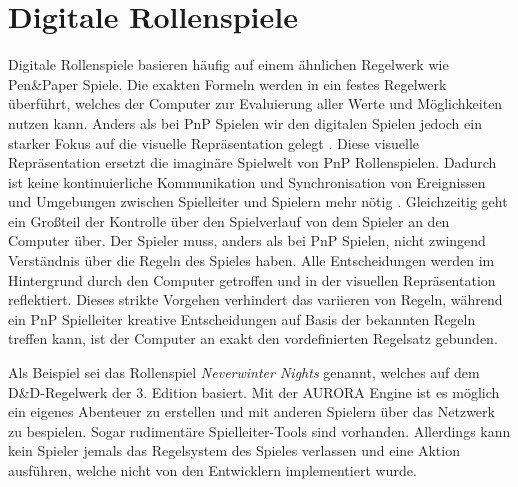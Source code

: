 \section{Digitale Rollenspiele}
\label{sec:DigitaleRollenspiele}
%

Digitale Rollenspiele basieren häufig auf einem ähnlichen Regelwerk wie Pen\&Paper Spiele. Die exakten Formeln werden in ein festes Regelwerk überführt, welches der Computer zur Evaluierung aller Werte und Möglichkeiten nutzen kann. Anders als bei PnP Spielen wir den digitalen Spielen jedoch ein starker Fokus auf die visuelle Repräsentation gelegt \cite{Tychsen2006}. Diese visuelle Repräsentation ersetzt die imaginäre Spielwelt von PnP Rollenspielen. Dadurch ist keine kontinuierliche Kommunikation und Synchronisation von Ereignissen und Umgebungen zwischen Spielleiter und Spielern mehr nötig \cite{Drachen2008}. \newline
Gleichzeitig geht ein Großteil der Kontrolle über den Spielverlauf von dem Spieler an den Computer über. Der Spieler muss, anders als bei PnP Spielen, nicht zwingend Verständnis über die Regeln des Spieles haben. Alle Entscheidungen werden im Hintergrund durch den Computer getroffen und in der visuellen Repräsentation reflektiert. Dieses strikte Vorgehen verhindert das variieren von Regeln, während ein PnP Spielleiter kreative Entscheidungen auf Basis der bekannten Regeln treffen kann, ist der Computer an exakt den vordefinierten Regelsatz gebunden. \cite{Drachen2008}

Als Beispiel sei das Rollenspiel \emph{Neverwinter Nights} genannt, welches auf dem D\&D-Regelwerk der 3. Edition basiert. Mit der AURORA Engine ist es möglich ein eigenes Abenteuer zu erstellen und mit anderen Spielern über das Netzwerk zu bespielen. Sogar rudimentäre Spielleiter-Tools sind vorhanden. Allerdings kann kein Spieler jemals das Regelsystem des Spieles verlassen und eine Aktion ausführen, welche nicht von den Entwicklern implementiert wurde.



